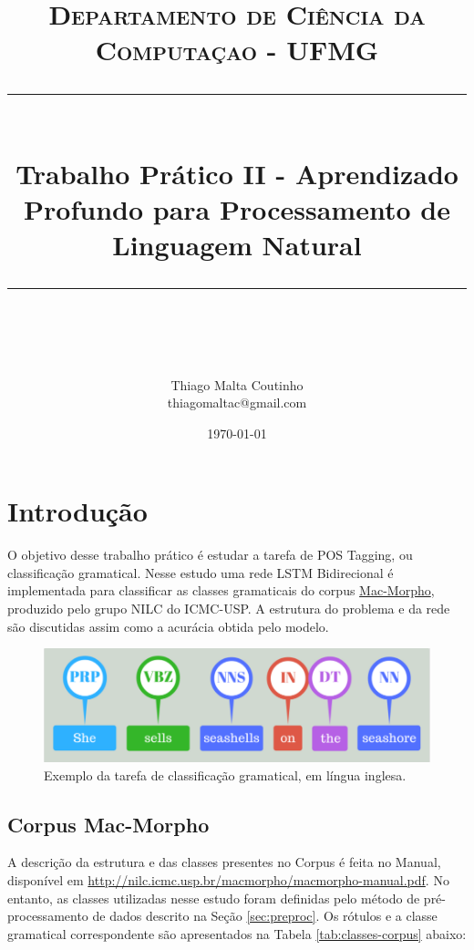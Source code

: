 \documentclass[11pt]{scrartcl} %
\title{	
	\normalfont\normalsize
	\textsc{Departamento de Ciência da Computaçao - UFMG}\\ %
	\vspace{25pt} %
	\rule{\linewidth}{0.5pt}\\ %
	\vspace{20pt} %
	{\huge Trabalho Prático II - Aprendizado Profundo para Processamento de Linguagem Natural}\\ %
	\vspace{12pt} %
	\rule{\linewidth}{2pt}\\ %
	\vspace{12pt} %
}
\author{\LARGE Thiago Malta Coutinho\\ thiagomaltac@gmail.com} %
\date{\normalsize\today} %
\begin{document}
\maketitle %


\section{Introdução}

O objetivo desse trabalho prático é estudar a tarefa de POS Tagging, ou classificação gramatical. Nesse estudo uma rede LSTM Bidirecional é implementada para classificar as classes gramaticais do corpus \href{http://nilc.icmc.usp.br/macmorpho/}{Mac-Morpho}, produzido pelo grupo NILC do ICMC-USP. A estrutura do problema e da rede são discutidas assim como a acurácia obtida pelo modelo.

\begin{figure}[h] %
	\centering
	\includegraphics[width=0.8\columnwidth]{./Figures/pos_tagging.png} %
	\caption{Exemplo da tarefa de classificação gramatical, em língua inglesa.}
\end{figure}


\subsection{Corpus Mac-Morpho}

A descrição da estrutura e das classes presentes no Corpus é feita no Manual, disponível em \href{http://nilc.icmc.usp.br/macmorpho/macmorpho-manual.pdf}{http://nilc.icmc.usp.br/macmorpho/macmorpho-manual.pdf}. No entanto, as classes utilizadas nesse estudo foram definidas pelo método de pré-processamento de dados descrito na Seção \ref{sec:preproc}. Os rótulos e a classe gramatical correspondente são apresentados na Tabela \ref{tab:classes-corpus} abaixo:
\end{document}
